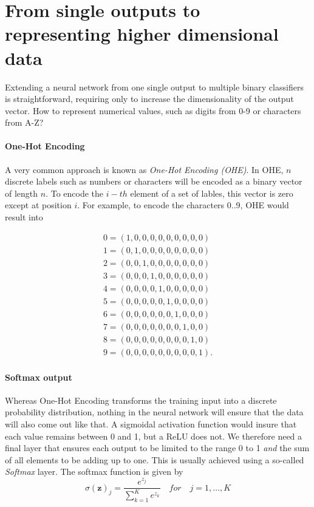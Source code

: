\documentclass[paper=6.14in:9.21in,pagesize=pdftex,11pt,twoside,openright]{scrbook}
\begin{document}
\section{From single outputs to representing higher dimensional data}
Extending a neural network from one single output to multiple binary classifiers is straightforward, requiring only to increase the dimensionality of the output vector. How to represent numerical values, such as digits from 0-9 or characters from A-Z? 


\paragraph{One-Hot Encoding}  A very common approach is known as \emph{One-Hot Encoding (OHE)}. In OHE, $n$ discrete labels such as numbers or characters will be encoded as a binary vector of length $n$. To encode the $i-th$ element of a set of lables, this vector is zero except at position $i$. For example, to encode the characters 0..9, OHE would result into

\begin{eqnarray}
\nonumber
0 = (1,0,0,0,0,0,0,0,0,0)\\
\nonumber
1 = (0,1,0,0,0,0,0,0,0,0)\\
\nonumber
2 = (0,0,1,0,0,0,0,0,0,0)\\
\nonumber
3 = (0,0,0,1,0,0,0,0,0,0)\\
\nonumber
4 = (0,0,0,0,1,0,0,0,0,0)\\
\nonumber
5 = (0,0,0,0,0,1,0,0,0,0)\\
\nonumber
6 = (0,0,0,0,0,0,1,0,0,0)\\
\nonumber
7 = (0,0,0,0,0,0,0,1,0,0)\\
\nonumber
8 = (0,0,0,0,0,0,0,0,1,0)\\
\nonumber
9 = (0,0,0,0,0,0,0,0,0,1).
\end{eqnarray}

\paragraph{Softmax output} Whereas One-Hot Encoding transforms the training input into a discrete probability distribution, nothing in the neural network will ensure that the data will also come out like that. A sigmoidal activation function would insure that each value remains between 0 and 1, but a ReLU does not. We therefore need a final layer that ensures each output to be limited to the range 0 to 1 \emph{and} the sum of all elements to be adding up to one. This is usually achieved using a so-called \emph{Softmax} layer. The softmax function is given by
\begin{equation}
{\sigma (\mathbf {z} )_{j}={\frac {e^{z_{j}}}{\sum _{k=1}^{K}e^{z_{k}}}}} \quad for \quad j=1,\ldots,K
\end{equation}
\end{document}
